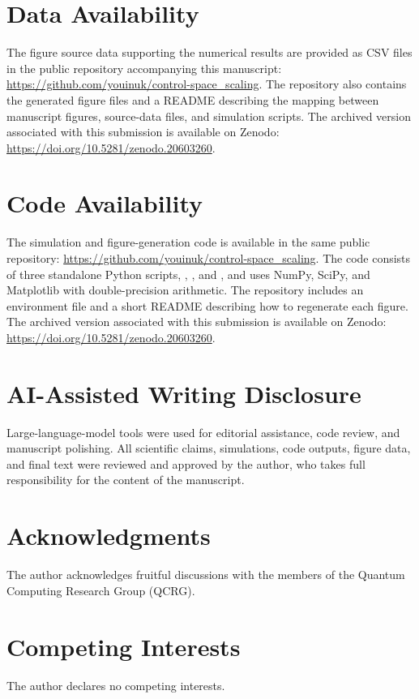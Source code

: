 \documentclass[a4paper,twocolumn,11pt]{quantumarticle}
\begin{document}
\section*{Data Availability}
The figure source data supporting the numerical results are provided as CSV files in the public repository accompanying this manuscript:
\url{https://github.com/youinuk/control-space_scaling}.
The repository also contains the generated figure files and a README describing the mapping between manuscript figures, source-data files, and simulation scripts. The archived version associated with this submission is available on Zenodo:
\url{https://doi.org/10.5281/zenodo.20603260}.

\section*{Code Availability}
The simulation and figure-generation code is available in the same public repository:
\url{https://github.com/youinuk/control-space_scaling}.
The code consists of three standalone Python scripts, , , and , and uses NumPy, SciPy, and Matplotlib with double-precision arithmetic. The repository includes an environment file and a short README describing how to regenerate each figure. The archived version associated with this submission is available on Zenodo:
\url{https://doi.org/10.5281/zenodo.20603260}.

\section*{AI-Assisted Writing Disclosure}
Large-language-model tools were used for editorial assistance, code review, and manuscript polishing. All scientific claims, simulations, code outputs, figure data, and final text were reviewed and approved by the author, who takes full responsibility for the content of the manuscript.

\section*{Acknowledgments}
The author acknowledges fruitful discussions with the members of the Quantum Computing Research Group (QCRG).

\section*{Competing Interests}
The author declares no competing interests.
\end{document}
